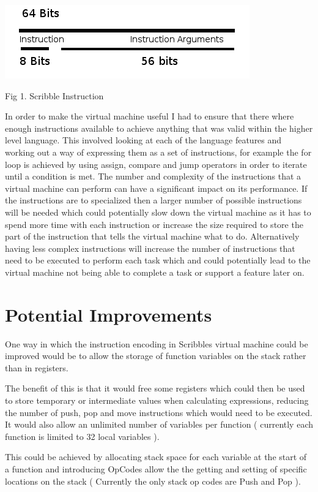 \documentclass[]{final_report}
\begin{document}
\includegraphics{"Instruction"}

Fig 1. Scribble Instruction

In order to make the virtual machine useful I had to ensure that there where enough instructions available to achieve anything that was valid within the higher level language. This involved looking at each of the language features and working out a way of expressing them as a set of instructions, for example the for loop is achieved by using assign, compare and jump operators in order to iterate until a condition is met. The number and complexity of the instructions that a virtual machine can perform can have a significant impact on its performance. If the instructions are to specialized then a larger number of possible instructions will be needed which could potentially slow down the virtual machine as it has to spend more time with each instruction or increase the size required to store the part of the instruction that tells the virtual machine what to do. Alternatively having less complex instructions will increase the number of instructions that need to be executed to perform each task which  and could potentially lead to the virtual machine not being able to complete a task or support a feature later on.

\section{Potential Improvements}

One way in which the instruction encoding in Scribbles virtual machine could be improved would be to allow the storage of function variables on the stack rather than in registers.

The benefit of this is that it would free some registers which could then be used to store temporary or intermediate values when calculating expressions, reducing the number of push, pop and move instructions which would need to be executed. It would also allow an unlimited number of variables per function ( currently each function is limited to 32 local variables ).

This could be achieved by allocating stack space for each variable at the start of a function and introducing OpCodes allow the the getting and setting of specific locations on the stack ( Currently the only stack op codes are Push and Pop ).
\end{document}

